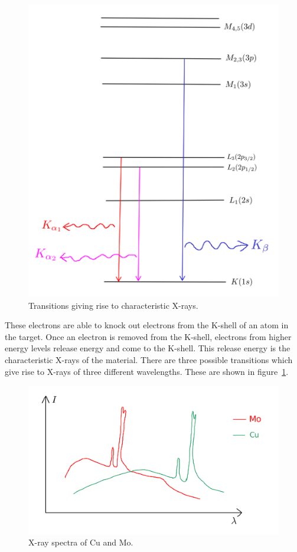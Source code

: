 \begin{figure}[h]
	\centering
	\includegraphics[scale=0.1]{characteristic_xray_transitions.png}
	\caption{\label{fig:xray_transitions}Transitions giving rise to characteristic X-rays.}
\end{figure}
	
	These electrons are able to knock out electrons from the K-shell of an atom in the target. Once an electron is removed from the K-shell, electrons from higher energy levels release energy and come to the K-shell. This release energy is the characteristic X-rays of the material. There are three possible transitions which give rise to X-rays of three different wavelengths. These are shown in figure~\ref{fig:xray_transitions}.
	
\begin{figure}[h]
	\centering
	\includegraphics[width=\textwidth]{xray_peaks.png}
	\caption{\label{fig:xray_spctra_Cu_Mo}X-ray spectra of Cu and Mo.}
\end{figure}
	
